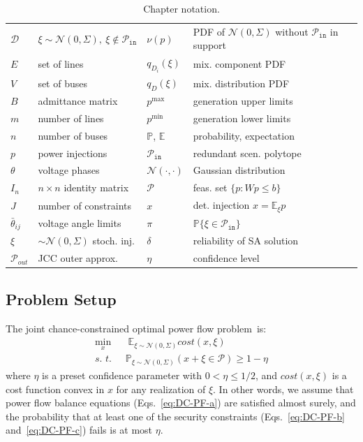 \begin{table}[t]
  \centering
  \begin{tabular}{|p{1.15cm}|p{4.95cm}|p{1.35cm}|p{4.85cm}|}
    $\mathcal{D}$  & $\xi \sim \mathcal{N}(0, \Sigma), ~\xi \notin \mathcal{P}_{\texttt{in}}$ & $\nu(p)$ & PDF of $\mathcal{N}(0, \Sigma)$ without $\mathcal{P}_{\texttt{in}}$ in support \\
    $E$    & set of lines & $q_{D_i}(\xi)$ & mix. component PDF \\
    $V$ & set of buses & $q_D(\xi)$ & mix. distribution PDF \\
    $B$ & admittance matrix& $p^{\max}$ & generation upper limits \\
    $m$ & number of lines & $p^{\min}$ & generation lower limits \\
    $n$ & number of buses & $\mathbb{P}$, $\mathbb{E}$ & probability, expectation \\
    $p$ & power injections & $\mathcal{P_{\texttt{in}}}$ & redundant scen. polytope \\
    $\theta$ & voltage phases & $\mathcal{N}(\cdot, \cdot)$ & Gaussian distribution \\
    $I_n$ & $n\times n$ identity matrix & $\mathcal{P} $ & feas. set  $\{p: Wp\leq b \}$ \\
    $J$ & number of constraints &  $x$ & det. injection $x = \mathbb{E}_\xi p$ \\
    $\bar\theta_{ij}$ & voltage angle limits & $\pi$ & $\mathbb{P}\{\xi \in \mathcal{P}_{\texttt{in}}\}$ \\
    $\xi$ & $\sim\mathcal{N}(0, \Sigma)$ stoch. inj. & $\delta$  & reliability of SA solution \\ 
    $\mathcal{P}_{out}$   & JCC outer approx.  & $\eta$  & confidence level 
  \end{tabular}
  \caption{Chapter notation. }
  \label{tab:notation}
  
\end{table}

\subsection{Problem Setup}
The joint chance-constrained optimal power flow problem~is:
\begin{equation}\label{eq:JCC-OPF}
    \begin{aligned}
  \min_x & \;\mathbb{E}_{\xi\sim \mathcal{N}(0, \Sigma)} \textit{cost}(x,\xi)\\
   \textit{s. t. }\; & \mathbb{P}_{\xi\sim \mathcal{N}(0, \Sigma)} (x+\xi \in \mathcal{P}) \ge 1 - \eta
   \end{aligned}
\end{equation}
where $\eta$ is a preset confidence parameter with $0 < \eta \le 1/2$, and $\textit{cost}(x, \xi)$ is a cost function convex in $x$ for any realization of $\xi$. In other words, we assume that power flow balance equations (Eqs.~\eqref{eq:DC-PF-a}) are satisfied almost surely, and the probability that at least one of the security constraints (Eqs.~\eqref{eq:DC-PF-b} and~\eqref{eq:DC-PF-c}) fails is at most $\eta$. 

